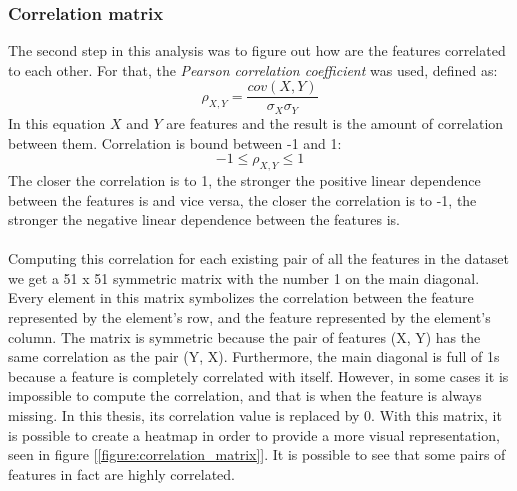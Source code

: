 \documentclass[11pt]{article}
\begin{document}
      \subsubsection{Correlation matrix}
        The second step in this analysis was to figure out how are the features correlated to each other. For that, the {\it Pearson correlation coefficient} was used, defined as: \cite{correlation}
        \begin{equation}
          \rho_{X, Y} = \frac{cov(X, Y)}{\sigma_X \sigma_Y}
        \end{equation}
        In this equation $X$ and $Y$ are features and the result is the amount of correlation between them. Correlation is bound between -1 and 1: \cite{correlation}
        \begin{equation}
          -1 \leq \rho_{X, Y} \leq 1
        \end{equation}
        The closer the correlation is to 1, the stronger the positive linear dependence between the features is and vice versa, the closer the correlation is to -1, the stronger the negative linear dependence between the features is.
        \\~\\
        Computing this correlation for each existing pair of all the features in the dataset we get a 51 x 51 symmetric matrix with the number 1 on the main diagonal. Every element in this matrix symbolizes the correlation between the feature represented by the element's row, and the feature represented by the element's column. The matrix is symmetric because the pair of features (X, Y) has the same correlation as the pair (Y, X). Furthermore, the main diagonal is full of 1s because a feature is completely correlated with itself. However, in some cases it is impossible to compute the correlation, and that is when the feature is always missing. In this thesis, its correlation value is replaced by 0. With this matrix, it is possible to create a heatmap in order to provide a more visual representation, seen in figure [\ref{figure:correlation_matrix}]. It is possible to see that some pairs of features in fact are highly correlated.
\end{document}
